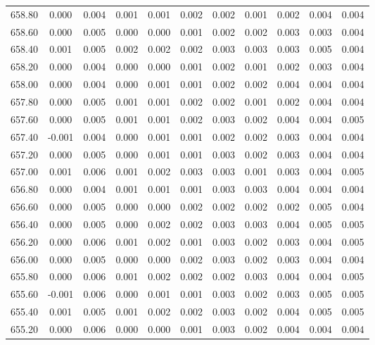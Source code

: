\begin{longtable}{cccccccccc}
    658.80 &  0.000 &  0.004 &  0.001 &  0.001 &  0.002 &  0.002 &  0.001 &  0.002 &  0.004 &  0.004 \\
    658.60 &  0.000 &  0.005 &  0.000 &  0.000 &  0.001 &  0.002 &  0.002 &  0.003 &  0.003 &  0.004 \\
    658.40 &  0.001 &  0.005 &  0.002 &  0.002 &  0.002 &  0.003 &  0.003 &  0.003 &  0.005 &  0.004 \\
    658.20 &  0.000 &  0.004 &  0.000 &  0.000 &  0.001 &  0.002 &  0.001 &  0.002 &  0.003 &  0.004 \\
    658.00 &  0.000 &  0.004 &  0.000 &  0.001 &  0.001 &  0.002 &  0.002 &  0.004 &  0.004 &  0.004 \\
    657.80 &  0.000 &  0.005 &  0.001 &  0.001 &  0.002 &  0.002 &  0.001 &  0.002 &  0.004 &  0.004 \\
    657.60 &  0.000 &  0.005 &  0.001 &  0.001 &  0.002 &  0.003 &  0.002 &  0.004 &  0.004 &  0.005 \\
    657.40 & -0.001 &  0.004 &  0.000 &  0.001 &  0.001 &  0.002 &  0.002 &  0.003 &  0.004 &  0.004 \\
    657.20 &  0.000 &  0.005 &  0.000 &  0.001 &  0.001 &  0.003 &  0.002 &  0.003 &  0.004 &  0.004 \\
    657.00 &  0.001 &  0.006 &  0.001 &  0.002 &  0.003 &  0.003 &  0.001 &  0.003 &  0.004 &  0.005 \\
    656.80 &  0.000 &  0.004 &  0.001 &  0.001 &  0.001 &  0.003 &  0.003 &  0.004 &  0.004 &  0.004 \\
    656.60 &  0.000 &  0.005 &  0.000 &  0.000 &  0.002 &  0.002 &  0.002 &  0.002 &  0.005 &  0.004 \\
    656.40 &  0.000 &  0.005 &  0.000 &  0.002 &  0.002 &  0.003 &  0.003 &  0.004 &  0.005 &  0.005 \\
    656.20 &  0.000 &  0.006 &  0.001 &  0.002 &  0.001 &  0.003 &  0.002 &  0.003 &  0.004 &  0.005 \\
    656.00 &  0.000 &  0.005 &  0.000 &  0.000 &  0.002 &  0.003 &  0.002 &  0.003 &  0.004 &  0.004 \\
    655.80 &  0.000 &  0.006 &  0.001 &  0.002 &  0.002 &  0.002 &  0.003 &  0.004 &  0.004 &  0.005 \\
    655.60 & -0.001 &  0.006 &  0.000 &  0.001 &  0.001 &  0.003 &  0.002 &  0.003 &  0.005 &  0.005 \\
    655.40 &  0.001 &  0.005 &  0.001 &  0.002 &  0.002 &  0.003 &  0.002 &  0.004 &  0.005 &  0.005 \\
    655.20 &  0.000 &  0.006 &  0.000 &  0.000 &  0.001 &  0.003 &  0.002 &  0.004 &  0.004 &  0.004 \\

\end{longtable}
